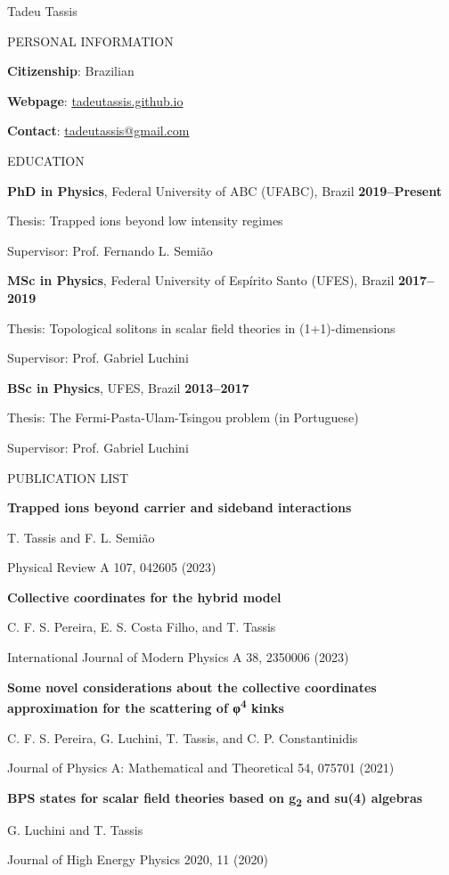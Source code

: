 \documentclass[11pt]{article}
\renewcommand{\Huge}{\fontsize{40}{48}\selectfont}
\renewcommand{\Large}{\fontsize{14}{16}\selectfont}
\newcommand{\linesep}{\vspace*{1em}}
\newcommand{\MyTitle}[1]{
    {\color{Indigo} \Huge \lsstyle \textsf{#1}} \par
    \vspace*{1em}
}
\newcommand{\MySection}[1]{
    \vspace*{2em}
    {\color{Indigo} \Large \textsf{\uppercase{#1}} \hrulefill} \par
    \vspace*{1em}
}
\newcommand{\InfoItem}[2]{
    \textbf{#1}: #2 \par
}
\newcommand{\EduItem}[6]{
    \textbf{#1}, #2, #3 \hfill \textbf{#4} \par
    {\small Thesis: #5 \par
    Supervisor: #6} \par
}
\newcommand{\PubItem}[3]{
    \textbf{#1} \par
    {\small #2 \par
    #3} \par
}
\begin{document}
\MyTitle{Tadeu \hspace{-15pt} Tassis}

\MySection{Personal information}

\InfoItem{Citizenship}{Brazilian}
\InfoItem{Webpage}{\href{https://tadeutassis.github.io}{tadeutassis.github.io}}
\InfoItem{Contact}{\href{mailto:tadeutassis@gmail.com}{tadeutassis@gmail.com}}

\MySection{Education}

\EduItem{PhD in Physics}
{Federal University of ABC (UFABC)}
{Brazil}
{2019--Present}
{Trapped ions beyond low intensity regimes}
{Prof. Fernando L. Semião}

\linesep

\EduItem{MSc in Physics}
{Federal University of Espírito Santo (UFES)}
{Brazil}
{2017--2019}
{Topological solitons in scalar field theories in (1+1)-dimensions}
{Prof. Gabriel Luchini}

\linesep

\EduItem{BSc in Physics}
{UFES}
{Brazil}
{2013--2017}
{The Fermi-Pasta-Ulam-Tsingou problem (in Portuguese)}
{Prof. Gabriel Luchini}

\MySection{Publication list}

\PubItem{Trapped ions beyond carrier and sideband interactions}
{T. Tassis and F. L. Semião}
{Physical Review A 107, 042605 (2023)}

\linesep

\PubItem{Collective coordinates for the hybrid model}
{C. F. S. Pereira, E. S. Costa Filho, and T. Tassis}
{International Journal of Modern Physics A 38, 2350006 (2023)}

\linesep

\PubItem{Some novel considerations about the collective coordinates approximation for the scattering of φ\textsuperscript{4} kinks}
{C. F. S. Pereira, G. Luchini, T. Tassis, and C. P. Constantinidis}
{Journal of Physics A: Mathematical and Theoretical 54, 075701 (2021)}

\linesep

\PubItem{BPS states for scalar field theories based on g\textsubscript{2} and su(4) algebras}
{G. Luchini and T. Tassis}
{Journal of High Energy Physics 2020, 11 (2020)}
\end{document}
